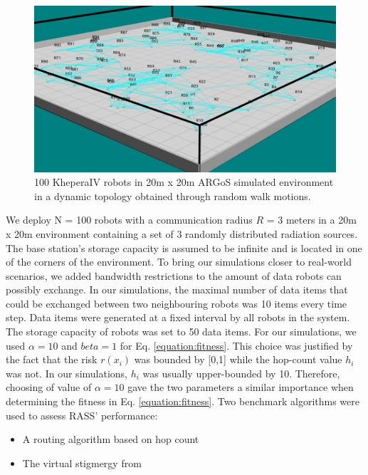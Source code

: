 \begin{figure}[H]
	\centering
    \includegraphics[width=\columnwidth]{images/argos_random.png}
    \caption[Random formation in ARGoS]{100 KheperaIV robots in 20m x 20m  ARGoS simulated environment in a dynamic topology obtained through random walk motions.}
    \label{argos:random-walk}
\end{figure}

We deploy N = 100 robots with a communication radius $R$ = 3 meters in a 20m x 20m environment containing a set of 3 randomly distributed radiation sources. The base station's storage capacity is assumed to be infinite and is located in one of the corners of the environment. To bring our simulations closer to real-world scenarios, we added bandwidth restrictions to the amount of data robots can possibly exchange. In our simulations, the maximal number of data items that could be exchanged between two neighbouring robots was 10 items every time step. Data items were generated at a fixed interval by all robots in the system. The storage capacity of robots was set to 50 data items. For our simulations, we used $\alpha = 10$ and $beta = 1$ for Eq. \ref{equation:fitness}. This choice was justified by the fact that the risk $r({x_i})$ was bounded by [0,1] while the hop-count value $h_i$ was not. In our simulations, $h_i$ was usually upper-bounded by 10. Therefore, choosing of value of $\alpha = 10$ gave the two parameters a similar importance when determining the fitness in Eq. \ref{equation:fitness}. Two benchmark algorithms were used to assess RASS' performance:

\begin{itemize}
    \item A routing algorithm based on hop count 
    \item The virtual stigmergy from \cite{pinciroliTuple2016}
\end{itemize}

